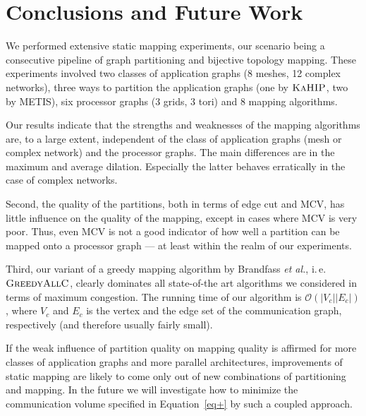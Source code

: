 \documentclass[pdftex]{llncs}
\newcommand{\ie}{i.\,e.\xspace}
\newcommand{\bigO}{\mathcal{O}}
\newcommand{\etal}{\textit{et al.}\xspace}
\newcommand{\metis}{\textsc{METIS}\xspace}
\newcommand{\kahip}{\textsc{KaHIP}\xspace}
\newcommand{\greedyallc}{\textsc{GreedyAllC}\xspace}
\begin{document}
\FloatBarrier


\section{Conclusions and Future Work}
\label{sec:conclusions}
We performed extensive static mapping experiments, our scenario being
a consecutive pipeline of graph partitioning and bijective topology mapping.
These experiments involved  two classes of application
graphs (8 meshes, 12 complex networks), three ways to partition the
application graphs (one by $\kahip$, two by \metis), six
processor graphs (3 grids, 3 tori) and 8 mapping algorithms.

Our results indicate that the strengths and weaknesses of the mapping algorithms are, to
a large extent, independent of the class of application graphs (mesh
or complex network) and the processor graphs. The main differences are
in the maximum and average dilation. Especially the latter behaves
erratically in the case of complex networks.

Second, the quality of the partitions, both in terms of edge cut and
MCV, has little influence on the quality of the mapping, except in
cases where MCV is very poor. Thus, even MCV is not a good indicator
of how well a partition can be mapped onto a processor graph --- at
least within the realm of our experiments.

Third, our variant of a greedy mapping algorithm by Brandfass \etal,
\ie $\greedyallc$, clearly dominates all state-of-the art algorithms we considered
in terms of maximum congestion. The running time of our algorithm is $\bigO(\vert V_c
\vert \vert E_c \vert)$, where $V_c$ and $E_c$ is the vertex and the
edge set of the communication graph, respectively (and therefore usually fairly small).

If the weak influence of partition quality on mapping quality is
affirmed for more classes of application graphs and more parallel
architectures, improvements of static mapping
are likely to come only out of new combinations of
partitioning and mapping. In the future we will investigate how 
to minimize the communication volume specified in Equation~\ref{eq+}
by such a coupled approach.





\end{document}
